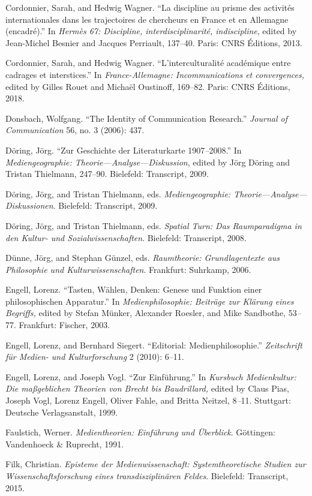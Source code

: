 \documentclass{tufte-handout}
\begin{document}
\begin{hangparas}{.25in}{1}
Cordonnier, Sarah, and Hedwig Wagner. ``La discipline au prisme des
activités internationales dans les trajectoires de chercheurs en France
et en Allemagne (encadré).'' In \emph{Hermès 67: Discipline,
interdisciplinarité, indiscipline}, edited by Jean-Michel Besnier and
Jacques Perriault, 137--40. Paris: CNRS Éditions, 2013.

Cordonnier, Sarah, and Hedwig Wagner. ``L'interculturalité académique
entre cadrages et interstices.'' In \emph{France-Allemagne:
Incommunications et convergences,} edited by Gilles Rouet and Michaël
Oustinoff, 169--82. Paris: CNRS Éditions, 2018.

Donsbach, Wolfgang. ``The Identity of Communication Research.''
\emph{Journal of Communication} 56, no. 3 (2006): 437.

Döring, Jörg. ``Zur Geschichte der Literaturkarte 1907\emph{--}2008.''
In \emph{Mediengeographie: Theorie---Analyse---Diskussion}, edited by
Jörg Döring and Tristan Thielmann, 247--90. Bielefeld: Transcript, 2009.

Döring, Jörg, and Tristan Thielmann, eds. \emph{Mediengeographie:
Theorie---Analyse---Diskussionen}. Bielefeld: Transcript, 2009.

Döring, Jörg, and Tristan Thielmann, eds. \emph{Spatial Turn: Das
Raumparadigma in den Kultur- und Sozialwissenschaften}. Bielefeld:
Transcript, 2008.

Dünne, Jörg, and Stephan Günzel, eds. \emph{Raumtheorie: Grundlagentexte
aus Philosophie und Kulturwissenschaften}. Frankfurt: Suhrkamp, 2006.

Engell, Lorenz. ``Tasten, Wählen, Denken: Genese und Funktion einer
philosophischen Apparatur.'' In \emph{Medienphilosophie: Beiträge zur
Klärung eines Begriffs,} edited by Stefan Münker, Alexander Roesler, and
Mike Sandbothe, 53\emph{--}77. Frankfurt: Fischer, 2003.

Engell, Lorenz, and Bernhard Siegert. ``Editorial: Medienphilosophie.''
\emph{Zeitschrift für Medien- und Kulturforschung} 2 (2010): 6--11.

Engell, Lorenz, and Joseph Vogl. ``Zur Einführung.'' In \emph{Kursbuch
Medienkultur: Die maßgeblichen Theorien von Brecht bis Baudrillard,}
edited by Claus Pias, Joseph Vogl, Lorenz Engell, Oliver Fahle, and
Britta Neitzel, 8\emph{--}11. Stuttgart: Deutsche Verlagsanstalt, 1999.

Faulstich, Werner. \emph{Medientheorien: Einführung und Überblick}.
Göttingen: Vandenhoeck \& Ruprecht, 1991.

Filk, Christian. \emph{Episteme der Medienwissenschaft:
Systemtheoretische Studien zur Wissenschaftsforschung eines
transdisziplinären Feldes}. Bielefeld: Transcript, 2015.


\end{hangparas}
\end{document}
